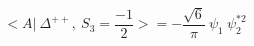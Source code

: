 \begin{equation}
<A|~\Delta^{++},~ S_3=\frac{-1}{2} >= -\frac{\sqrt{6}}{\pi} ~\psi_1 ~ \psi_2^{*2}
\end{equation}

